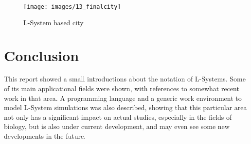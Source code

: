 \documentclass{acmtog}
\begin{document}
\begin{figure}[!htp]
  \begin{center}
    \texttt{[image: images/13\_finalcity]}
    \caption{L-System based city \label{fig:finalcity}}
    \end{center}
\end{figure}

\section{Conclusion}

This report showed a small introductions about the notation of L-Systems. Some of its main applicational fields were shown, with references to somewhat recent work in that area. A programming language and a generic work environment to model L-System simulations was also described, showing that this particular area not only has a significant impact on actual studies, especially in the fields of biology, but is also under current development, and may even see some new developments in the future.


\nocite{*}



\end{document}
